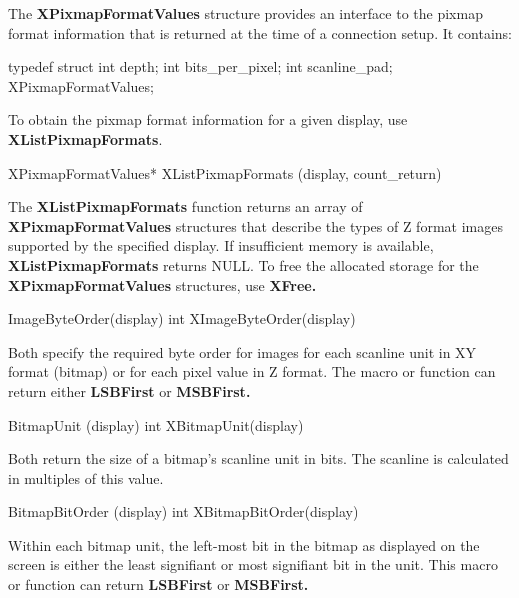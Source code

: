 \documentclass{report}
\begin{document}
\begin{itemize}
            \bigbreak \noindent 
            The \textbf{XPixmapFormatValues} structure provides an interface to the pixmap format information that is returned at the time of a connection setup. It contains:
            \bigbreak \noindent 
            \begin{cppcode}
                typedef struct {
                    int depth;
                    int bits_per_pixel;
                    int scanline_pad;
                } XPixmapFormatValues;
            \end{cppcode}
            \bigbreak \noindent 
            To obtain the pixmap format information for a given display, use \textbf{XListPixmapFormats}.
            \bigbreak \noindent 
            \begin{cppcode}
            XPixmapFormatValues* XListPixmapFormats (display, count_return)
            \end{cppcode}
            \bigbreak \noindent 
            The \textbf{XListPixmapFormats} function returns an array of \textbf{XPixmapFormatValues} structures that describe the types of Z format images supported by the specified display. If insufficient memory is available, \textbf{XListPixmapFormats} returns NULL. To free the allocated storage for the \textbf{XPixmapFormatValues} structures, use \textbf{XFree.}
            \bigbreak \noindent 
            \begin{cppcode}
            ImageByteOrder(display)
            int XImageByteOrder(display)
            \end{cppcode}
            \bigbreak \noindent 
            Both specify the required byte order for images for each scanline unit in XY format (bitmap) or for each pixel value in Z format. The macro or function can return either \textbf{LSBFirst} or \textbf{MSBFirst.}
            \bigbreak \noindent 
            \begin{cppcode}
                BitmapUnit (display)
                int XBitmapUnit(display)
            \end{cppcode}
            \bigbreak \noindent 
            Both return the size of a bitmap’s scanline unit in bits. The scanline is calculated in multiples of this value.
            \bigbreak \noindent 
            \begin{cppcode}
                BitmapBitOrder (display)
                int XBitmapBitOrder(display)
            \end{cppcode}
            \bigbreak \noindent 
            Within each bitmap unit, the left-most bit in the bitmap as displayed on the screen is either the least signifiant or most signifiant bit in the unit. This macro or function can return \textbf{LSBFirst} or \textbf{MSBFirst.}

\end{itemize}
\end{document}
